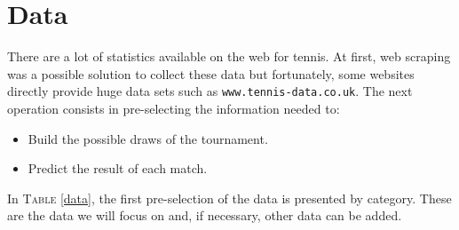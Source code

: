\documentclass[12pt]{article}
\begin{document}
\section*{Data}
There are a lot of statistics available on the web for tennis. At first, web scraping was a possible solution to collect these data but fortunately, some websites directly provide huge data sets such as \texttt{www.tennis-data.co.uk}. The next operation consists in pre-selecting the information needed to:
\begin{itemize}
    \item Build the possible draws of the tournament.
    \item Predict the result of each match.
\end{itemize}

In \textsc{Table} \ref{data}, the first pre-selection of the data is presented by category. These are the data we will focus on and, if necessary, other data can be added.\\
\end{document}

